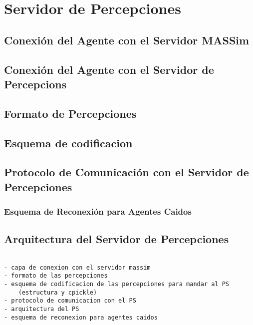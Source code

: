 \chapter{Servidor de Percepciones}
\label{chap:servidor_de_percepciones}

\section{Conexión del Agente con el Servidor MASSim}

\section{Conexión del Agente con el Servidor de Percepcions}

\section{Formato de Percepciones}

\section{Esquema de codificacion}

\section{Protocolo de Comunicación con el Servidor de Percepciones}

\subsection{Esquema de Reconexión para Agentes Caidos}

\section{Arquitectura del Servidor de Percepciones}

\begin{verbatim}

- capa de conexion con el servidor massim
- formato de las percepciones
- esquema de codificacion de las percepciones para mandar al PS
    (estructura y cpickle) 
- protocolo de comunicacion con el PS
- arquitectura del PS
- esquema de reconexion para agentes caidos
\end{verbatim}